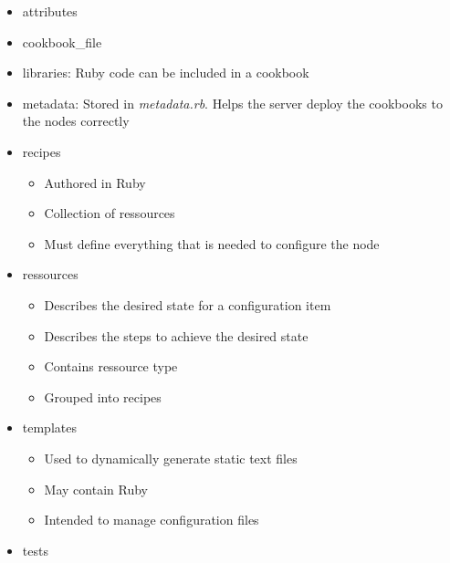\begin{itemize}
\begin{itemize}
				\item attributes
				\item cookbook\_file
				\item libraries: Ruby code can be included in a cookbook
				\item metadata: Stored in \textit{metadata.rb}. Helps the server deploy the cookbooks to the nodes correctly
				\item recipes
					\begin{itemize}
						\item Authored in Ruby
						\item Collection of ressources
						\item Must define everything that is needed to configure the node
					\end{itemize}
				\item ressources
					\begin{itemize}
						\item Describes the desired state for a configuration item
						\item Describes the steps to achieve the desired state
						\item Contains ressource type
						\item Grouped into recipes
					\end{itemize}
				\item templates
					\begin{itemize}
						\item Used to dynamically generate static text files
						\item May contain Ruby
						\item Intended to manage configuration files
					\end{itemize}
				\item tests
			\end{itemize}
	\end{itemize}

